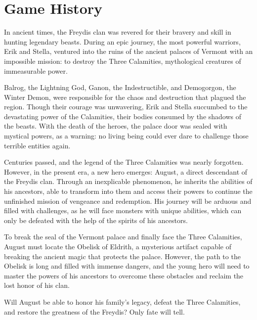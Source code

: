\section{Game History}

In ancient times, the Freydis clan was revered for their bravery and skill in hunting legendary beasts. During an epic journey, the most powerful warriors, Erik and Stella, ventured into the ruins of the ancient palaces of Vermont with an impossible mission: to destroy the Three Calamities, mythological creatures of immeasurable power.

Balrog, the Lightning God, Ganon, the Indestructible, and Demogorgon, the Winter Demon, were responsible for the chaos and destruction that plagued the region. Though their courage was unwavering, Erik and Stella succumbed to the devastating power of the Calamities, their bodies consumed by the shadows of the beasts. With the death of the heroes, the palace door was sealed with mystical powers, as a warning: no living being could ever dare to challenge those terrible entities again.

Centuries passed, and the legend of the Three Calamities was nearly forgotten. However, in the present era, a new hero emerges: August, a direct descendant of the Freydis clan. Through an inexplicable phenomenon, he inherits the abilities of his ancestors, able to transform into them and access their powers to continue the unfinished mission of vengeance and redemption. His journey will be arduous and filled with challenges, as he will face monsters with unique abilities, which can only be defeated with the help of the spirits of his ancestors.

To break the seal of the Vermont palace and finally face the Three Calamities, August must locate the Obelisk of Eldrith, a mysterious artifact capable of breaking the ancient magic that protects the palace. However, the path to the Obelisk is long and filled with immense dangers, and the young hero will need to master the powers of his ancestors to overcome these obstacles and reclaim the lost honor of his clan.

Will August be able to honor his family’s legacy, defeat the Three Calamities, and restore the greatness of the Freydis? Only fate will tell.